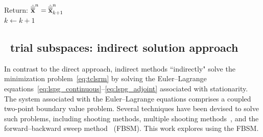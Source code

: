 \begin{algorithm}
{{Return: $\hat{\overline{\overline{\mathbf {x}}}}^{n} = \hat{\overline{\overline{\mathbf {x}}}}^{n}_{k+1} $ \\
}
$k\leftarrow k+1$
}
\end{algorithm}


%

\subsection{\spatialAcronym\ trial subspaces: indirect solution approach}\label{sec:indirect}
In contrast to the direct approach,
indirect methods ``indirectly" solve the minimization
problem~\eqref{eq:tclsrm} by solving the Euler--Lagrange
equations~\eqref{eq:lspg_continuous}--\eqref{eq:lspg_adjoint} associated with
stationarity. The
system associated with the Euler--Lagrange equations comprises a coupled two-point boundary value
problem. Several techniques have
been devised to solve such problems, 
including shooting methods, multiple shooting
methods~\cite{multiple_shooting}, and the forward--backward sweep
method~\cite{fbs} (FBSM).  This work explores using the FBSM. 


